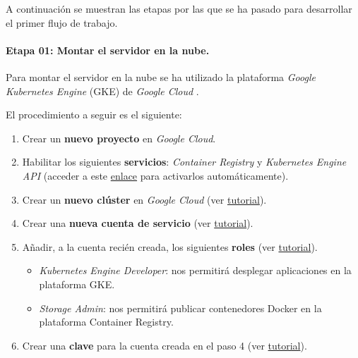 A continuación se muestran las etapas por las que se ha pasado para
desarrollar el primer flujo de trabajo.

\paragraph{Etapa 01: Montar el servidor en la nube.}

Para montar el servidor en la nube se ha utilizado la plataforma
\emph{Google Kubernetes Engine} (GKE) de \emph{Google Cloud} \cite{cloud:web}.

El procedimiento a seguir es el siguiente:

\begin{enumerate}
\def\labelenumi{\arabic{enumi}.}
\tightlist
\item
  Crear un \textbf{nuevo proyecto} en \emph{Google Cloud}.
\item
  Habilitar los siguientes \textbf{servicios}: \emph{Container Registry}
  y \emph{Kubernetes Engine API} (acceder a este
  \href{https://console.cloud.google.com/flows/enableapi?apiid=containerregistry.googleapis.com,container.googleapis.com}{enlace}
  para activarlos automáticamente).
\item
  Crear un \textbf{nuevo clúster} en \emph{Google Cloud} (ver
  \href{https://cloud.google.com/kubernetes-engine/docs/quickstart\#create_cluster}{tutorial}).
\item
  Crear una \textbf{nueva cuenta de servicio} (ver
  \href{https://cloud.google.com/iam/docs/creating-managing-service-accounts}{tutorial}).
\item
  Añadir, a la cuenta recién creada, los siguientes \textbf{roles} (ver
  \href{https://cloud.google.com/iam/docs/granting-roles-to-service-accounts\#granting_access_to_a_service_account_for_a_resource}{tutorial}).

  \begin{itemize}
  \tightlist
  \item
    \emph{Kubernetes Engine Developer}: nos permitirá desplegar
    aplicaciones en la plataforma GKE.
  \item
    \emph{Storage Admin}: nos permitirá publicar contenedores Docker en
    la plataforma Container Registry.
  \end{itemize}
\item
  Crear una \textbf{clave} para la cuenta creada en el paso 4 (ver
  \href{https://cloud.google.com/iam/docs/creating-managing-service-account-keys}{tutorial}).
\end{enumerate}

